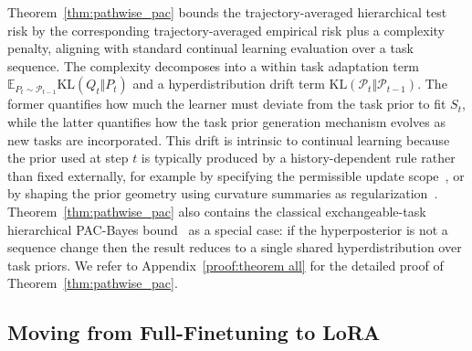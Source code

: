 \documentclass{article}
\theoremstyle{plain}
\theoremstyle{definition}
\theoremstyle{remark}
\begin{document}
Theorem~\ref{thm:pathwise_pac} bounds the trajectory-averaged hierarchical test risk by the corresponding trajectory-averaged empirical risk plus a complexity penalty, aligning with standard continual learning evaluation over a task sequence.
The complexity decomposes into a within task adaptation term $\mathbb E_{P_t\sim\mathcal P_{t-1}}\mathrm{KL}(Q_t\Vert P_t)$ and a hyperdistribution drift term $\mathrm{KL}(\mathcal P_t\Vert\mathcal P_{t-1})$. The former quantifies how much the learner must deviate from the task prior to fit $S_t$, while the latter quantifies how the task prior generation mechanism evolves as new tasks are incorporated.
This drift is intrinsic to continual learning because the prior used at step $t$ is typically produced by a history-dependent rule rather than fixed externally,
for example by specifying the permissible update scope~\citep{HAT2018,Supermasks2020,hu_lora_2021}, or by shaping the prior geometry using curvature summaries as regularization~\citep{EWC2017,SI2017}.
Theorem~\ref{thm:pathwise_pac} also contains the classical exchangeable-task hierarchical PAC-Bayes bound~\citep{pentinaPACBayesianBoundLifelong2014} as a special case: if the hyperposterior is not a sequence change then the result reduces to a single shared hyperdistribution over task priors. We refer to Appendix~\ref{proof:theorem all} for the detailed proof of Theorem~\ref{thm:pathwise_pac}.

\subsection{Moving from Full-Finetuning to LoRA}
\label{sec:kl-decomp-pecl}
\end{document}
